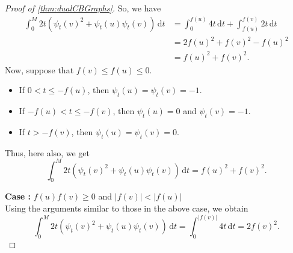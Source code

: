 \documentclass[12pt,a4paper,bold]{thesis}
\theoremstyle{definition}
\newcommand*{\abs}[1]{\left\vert #1 \right\vert}
\newcounter{casenum}
\newenvironment{caseof}{\setcounter{casenum}{1}}{\vskip0\baselineskip}
\newcommand{\case}[2]{\vskip0\baselineskip\par\noindent 
{\bfseries Case \arabic{casenum}:} #1\\#2\addtocounter{casenum}{1}}
\begin{document}
\begin{proof}[Proof of \cref{thm:dualCBGraphs}]
\begin{caseof}
{        So, we have 
        \begin{align*}
            \int_{0}^{M} 2t (\psi_t(v)^2 + \psi_t(u)\psi_t(v))\, \mathrm{d}t 
            & = 
            \int_{0}^{f(u)} 4t \, \mathrm{d}t + \int_{f(u)}^{f(v)} 2t\, \mathrm{d}t
            \\
            & =
            2f(u)^2 + f(v)^2 - f(u)^2
            \\
            & =
            f(u)^2 + f(v)^2.
        \end{align*}
        Now, suppose that $f(v) \leq f(u) \leq 0$.
        \vspace{-0.4\baselineskip} 
        \begin{itemize}[leftmargin=*,noitemsep]
            \item If $0 < t \leq -f(u)$, then $\psi_t(u) = \psi_t(v) = -1$.
            \item If $-f(u) < t \leq -f(v)$, then $\psi_t(u) = 0$ and $\psi_t(v) = -1$.
            \item If $t > -f(v)$, then $\psi_t(u) = \psi_t(v) = 0$.
        \end{itemize}
        \vspace{-0.4\baselineskip}
        Thus, here also, we get
        \begin{equation*}
            \int_{0}^{M} 2t (\psi_t(v)^2 + \psi_t(u)\psi_t(v))\, \mathrm{d}t = f(u)^2 + f(v)^2.
        \end{equation*}}

        \case{$f(u)f(v) \geq 0$ and $\abs{f(v)} < \abs{f(u)}$}
        {Using the arguments similar to those in the above case, we obtain
        \begin{equation*}
            \int_{0}^{M} 2t (\psi_t(v)^2 + \psi_t(u)\psi_t(v))\, \mathrm{d}t 
            = \int_{0}^{\abs{f(v)}} 4t\, \mathrm{d}t = 2f(v)^2.
        \end{equation*}}


\end{caseof}
\end{proof}
\end{document}
